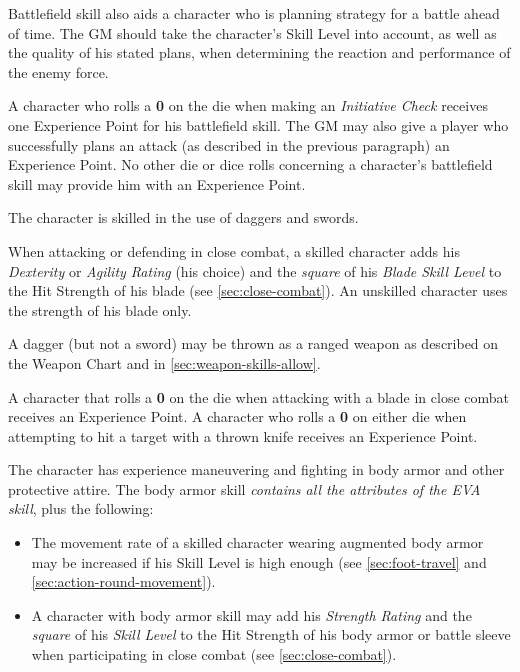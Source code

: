 Battlefield skill also aids a character who is planning strategy for a
battle ahead of time.  The GM should take the character's Skill Level
into account, as well as the quality of his stated plans, when
determining the reaction and performance of the enemy force.

A character who rolls a \textbf{0} on the die when making an
\emph{Initiative Check} receives one Experience Point for his
battlefield skill.  The GM may also give a player who successfully
plans an attack (as described in the previous paragraph) an Experience
Point.  No other die or dice rolls concerning a character's battlefield
skill may provide him with an Experience Point.


\label{sec:skill-blades}

The character is skilled in the use of daggers and swords.

When attacking or defending in close combat, a skilled character adds
his \emph{Dexterity} or \emph{Agility Rating} (his choice) and the
\emph{square} of his \emph{Blade Skill Level} to the Hit Strength of
his blade (see \ref{sec:close-combat}).  An unskilled character uses
the strength of his blade only.

A dagger (but not a sword) may be thrown as a ranged weapon as
described on the Weapon Chart and in \ref{sec:weapon-skills-allow}.

A character that rolls a \textbf{0} on the die when attacking with a
blade in close combat receives an Experience Point.  A character who
rolls a \textbf{0} on either die when attempting to hit a target with
a thrown knife receives an Experience Point.

\label{sec:skill-body-armor}

The character has experience maneuvering and fighting in 
body armor and other protective attire.  The body armor skill
\emph{contains all the attributes of the EVA skill},  plus the
following:

\begin{itemize}
\item The movement rate of a skilled character wearing augmented body
  armor may be increased if his Skill Level is high enough (see
  \ref{sec:foot-travel} and \ref{sec:action-round-movement}).
\item A character with body armor skill may add his \emph{Strength
    Rating} and the \emph{square} of his \emph{Skill Level} to the Hit
  Strength of his body armor or battle sleeve when participating in
  close combat (see \ref{sec:close-combat}).
\end{itemize}

